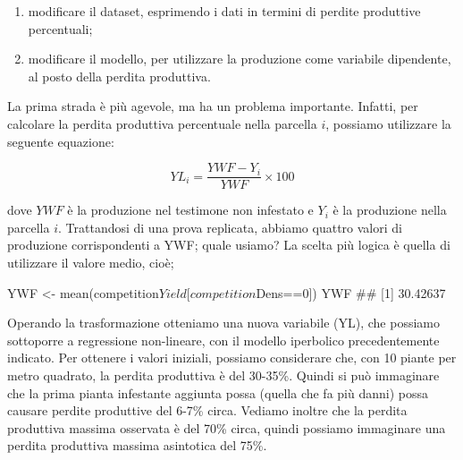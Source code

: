\documentclass[a4paper,12pt,oneside]{book}
\providecommand{\tightlist}{%
  \setlength{\itemsep}{0pt}\setlength{\parskip}{0pt}}
\newenvironment{Shaded}{\begin{snugshade}}{\end{snugshade}}
\newcommand{\DecValTok}[1]{#1}
\newcommand{\SpecialCharTok}[1]{#1}
\newcommand{\DocumentationTok}[1]{#1}
\newcommand{\OtherTok}[1]{#1}
\newcommand{\FunctionTok}[1]{#1}
\newcommand{\NormalTok}[1]{#1}
\begin{document}
\begin{enumerate}
\def\labelenumi{\arabic{enumi}.}
\tightlist
\item
  modificare il dataset, esprimendo i dati in termini di perdite produttive percentuali;
\item
  modificare il modello, per utilizzare la produzione come variabile dipendente, al posto della perdita produttiva.
\end{enumerate}

La prima strada è più agevole, ma ha un problema importante. Infatti, per calcolare la perdita produttiva percentuale nella parcella \(i\), possiamo utilizzare la seguente equazione:

\[YL_i = \frac{YWF - Y_i}{YWF} \times 100\]

dove \(YWF\) è la produzione nel testimone non infestato e \(Y_i\) è la produzione nella parcella \(i\). Trattandosi di una prova replicata, abbiamo quattro valori di produzione corrispondenti a YWF; quale usiamo? La scelta più logica è quella di utilizzare il valore medio, cioè;

\begin{Shaded}
\begin{Highlighting}[]
\NormalTok{YWF }\OtherTok{\textless{}{-}} \FunctionTok{mean}\NormalTok{(competition}\SpecialCharTok{$}\NormalTok{Yield[competition}\SpecialCharTok{$}\NormalTok{Dens}\SpecialCharTok{==}\DecValTok{0}\NormalTok{])}
\NormalTok{YWF}
\DocumentationTok{\#\# [1] 30.42637}
\end{Highlighting}
\end{Shaded}

Operando la trasformazione otteniamo una nuova variabile (YL), che possiamo sottoporre a regressione non-lineare, con il modello iperbolico precedentemente indicato. Per ottenere i valori iniziali, possiamo considerare che, con 10 piante per metro quadrato, la perdita produttiva è del 30-35\%. Quindi si può immaginare che la prima pianta infestante aggiunta possa (quella che fa più danni) possa causare perdite produttive del 6-7\% circa. Vediamo inoltre che la perdita produttiva massima osservata è del 70\% circa, quindi possiamo immaginare una perdita produttiva massima asintotica del 75\%.
\end{document}
